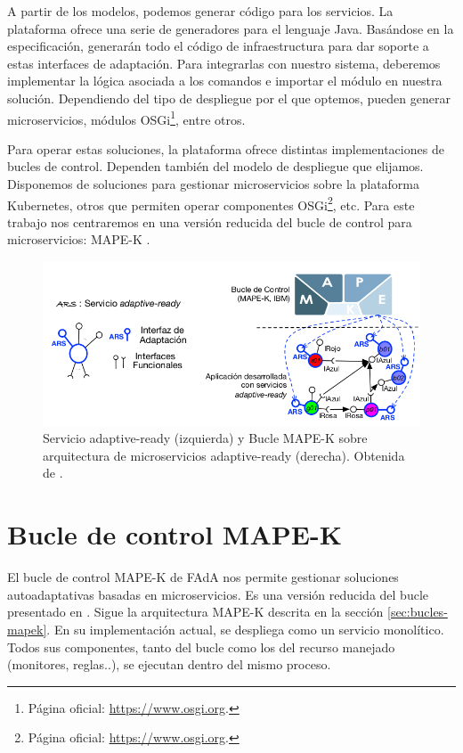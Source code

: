 A partir de los modelos, podemos generar código para los servicios. La plataforma ofrece una serie de generadores para el lenguaje Java. Basándose en la especificación, generarán todo el código de infraestructura para dar soporte a estas interfaces de adaptación. Para integrarlas con nuestro sistema, deberemos implementar la lógica asociada a los comandos e importar el módulo en nuestra solución. Dependiendo del tipo de despliegue por el que optemos, pueden generar microservicios, módulos OSGi\footnote{Página oficial: \url{https://www.osgi.org}.}, entre otros.

Para operar estas soluciones, la plataforma ofrece distintas implementaciones de bucles de control. Dependen también del modelo de despliegue que elijamos. Disponemos de soluciones para gestionar microservicios sobre la plataforma Kubernetes\cite{fonsServiciosAdaptivereadyPara2021}, otros que permiten operar componentes OSGi\footnote{Página oficial: \url{https://www.osgi.org}.}, etc. Para este trabajo nos centraremos en una versión reducida del bucle de control para microservicios: MAPE-K .

\begin{figure}[htb]
  \centering
  \includegraphics[scale=0.4]{cap_sistema_original/images/adaptive-ready-services}
  \caption[Servicio adaptive-ready y Bucle MAPE-K sobre arquitectura de mi-
  croservicios adaptive-ready.]{Servicio adaptive-ready (izquierda) y Bucle MAPE-K sobre arquitectura de microservicios adaptive-ready (derecha). Obtenida de \cite{fonsServiciosAdaptivereadyPara2021}.}
  \label{fig:adaptive-ready-services}
\end{figure}


\section{Bucle de control MAPE-K }

El bucle de control MAPE-K  de FAdA nos permite gestionar soluciones autoadaptativas basadas en microservicios. Es una versión reducida del bucle presentado en \cite{fonsEspecificacionSistemasAutoadaptativos2021}. Sigue la arquitectura MAPE-K descrita en la sección \ref{sec:bucles-mapek}. En su implementación actual, se despliega como un servicio monolítico. Todos sus componentes, tanto del bucle como los del recurso manejado (monitores, reglas..), se ejecutan dentro del mismo proceso.

